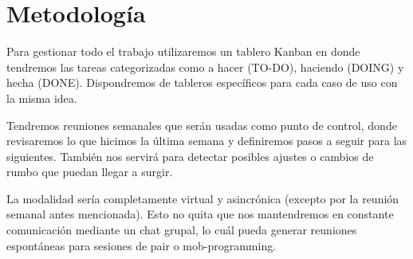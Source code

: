 \section{Metodología}

Para gestionar todo el trabajo utilizaremos un tablero Kanban en donde tendremos las tareas categorizadas como a hacer (TO-DO), haciendo (DOING) y hecha (DONE). Dispondremos de tableros específicos para cada caso de uso con la misma idea.

Tendremos reuniones semanales que serán usadas como punto de control, donde revisaremos lo que hicimos la última semana y definiremos pasos a seguir para las siguientes. También nos servirá para detectar posibles ajustes o cambios de rumbo que puedan llegar a surgir.

La modalidad sería completamente virtual y asincrónica (excepto por la reunión semanal antes mencionada). Esto no quita que nos mantendremos en constante comunicación mediante un chat grupal, lo cuál pueda generar reuniones espontáneas para sesiones de pair o mob-programming.